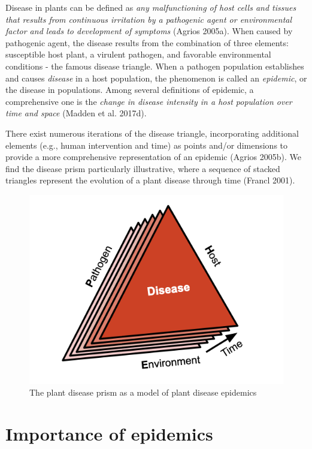 \documentclass[
  letterpaper,
  DIV=11,
  numbers=noendperiod]{scrreprt}
\begin{document}
Disease in plants can be defined as \emph{any malfunctioning of host
cells and tissues that results from continuous irritation by a
pathogenic agent or environmental factor and leads to development of
symptoms} (Agrios 2005a). When caused by pathogenic agent, the disease
results from the combination of three elements: susceptible host plant,
a virulent pathogen, and favorable environmental conditions - the famous
disease triangle. When a pathogen population establishes and causes
\emph{disease} in a host population, the phenomenon is called an
\emph{epidemic}, or the disease in populations. Among several
definitions of epidemic, a comprehensive one is the \emph{change in
disease intensity in a host population over time and space} (Madden et
al. 2017d).

There exist numerous iterations of the disease triangle, incorporating
additional elements (e.g., human intervention and time) as points and/or
dimensions to provide a more comprehensive representation of an epidemic
(Agrios 2005b). We find the disease prism particularly illustrative,
where a sequence of stacked triangles represent the evolution of a plant
disease through time (Francl 2001).

\begin{figure}

{\centering \includegraphics[width=4.625in,height=\textheight]{imgs/prism.png}

}

\caption{\label{fig-prism}The plant disease prism as a model of plant
disease epidemics}

\end{figure}

\hypertarget{importance-of-epidemics}{%
\section{Importance of epidemics}\label{importance-of-epidemics}}
\end{document}
